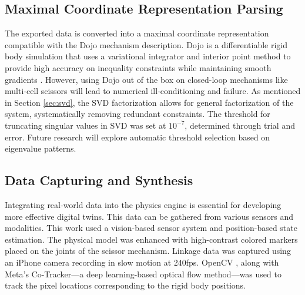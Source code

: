 \subsection{Maximal Coordinate Representation Parsing}

The exported data is converted into a maximal coordinate representation compatible with the Dojo mechanism description. Dojo is a differentiable rigid body simulation that uses a variational integrator and interior point method to provide high accuracy on inequality constraints while maintaining smooth gradients \cite{howell_dojo_2022}. However, using Dojo out of the box on closed-loop mechanisms like multi-cell scissors will lead to numerical ill-conditioning and failure. As mentioned in Section \ref{sec:svd}, the SVD factorization allows for general factorization of the system, systematically removing redundant constraints. The threshold for truncating singular values in SVD was set at \(10^{-7}\), determined through trial and error. Future research will explore automatic threshold selection based on eigenvalue patterns.

\subsection{Data Capturing and Synthesis}

Integrating real-world data into the physics engine is essential for developing more effective digital twins. This data can be gathered from various sensors and modalities. This work used a vision-based sensor system and position-based state estimation. The physical model was enhanced with high-contrast colored markers placed on the joints of the scissor mechanism. Linkage data was captured using an iPhone camera recording in slow motion at 240fps. OpenCV \cite{itseez_open_2015}, along with Meta's Co-Tracker\cite{karaev_cotracker_2023}—a deep learning-based optical flow method—was used to track the pixel locations corresponding to the rigid body positions.


